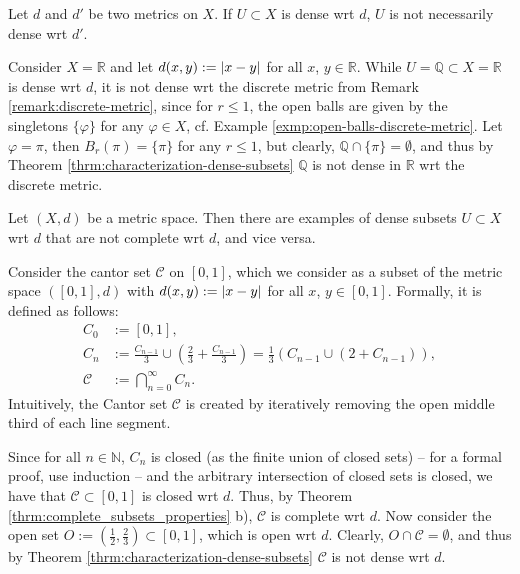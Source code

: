 \begin{remark}
	Let $d$ and $d'$ be two metrics on $X$. If $U\subset X$ is dense wrt $d$, $U$ is not necessarily dense wrt $d'$.
\end{remark}

\begin{exmp}
	Consider $X=\mathbb R$ and let $d(x, y) := \left\vert x - y \right\vert$ for all $x$, $y\in\mathbb R$. While $U = \mathbb Q \subset X = \mathbb R$ is dense wrt $d$, it is not dense wrt the discrete metric from Remark \ref{remark:discrete-metric}, since for $r \leq 1$, the open balls are given by the singletons $\{\varphi\}$ for any $\varphi\in X$, cf. Example \ref{exmp:open-balls-discrete-metric}. Let $\varphi = \pi$, then $B_{r}(\pi) = \{\pi\}$ for any $r\leq 1$, but clearly, $\mathbb Q \cap \{\pi\} = \emptyset$, and thus by Theorem \ref{thrm:characterization-dense-subsets} $\mathbb Q$ is not dense in $\mathbb R$ wrt the discrete metric.
\end{exmp}

\begin{remark}
	Let $(X, d)$ be a metric space. Then there are examples of dense subsets $U\subset X$ wrt $d$ that are not complete wrt $d$, and vice versa.
\end{remark}

\begin{exmp}
	Consider the cantor set $\mathcal C$ on $[0, 1]$, which we consider as a subset of the metric space $\left([0, 1], d\right)$ with $d(x, y) := \left\vert x - y \right\vert$ for all $x$, $y\in[0, 1]$. Formally, it is defined as follows:
	\begin{align}
		C_{0} &:= [0, 1],
		\\ C_{n} &:= \frac{C_{n-1}}{3} \cup \left(\frac{2}{3} + \frac{C_{n-1}}{3}\right) = \frac{1}{3}\left(C_{n-1} \cup \left( 2 + C_{n-1} \right)\right),
		\\ \mathcal C &:= \bigcap_{n=0}^{\infty}C_n.
	\end{align} 
	Intuitively, the Cantor set $\mathcal C$ is created by iteratively removing the open middle third of each line segment.
	
	Since for all $n\in\mathbb N$, $C_n$ is closed (as the finite union of closed sets) -- for a formal proof, use induction -- and the arbitrary intersection of closed sets is closed, we have that $\mathcal C\subset [0, 1]$ is closed wrt $d$. Thus, by Theorem \ref{thrm:complete_subsets_properties} b), $\mathcal C$ is complete wrt $d$. Now consider the open set $O := \left(\frac{1}{2}, \frac{2}{3}\right) \subset [0, 1]$, which is open wrt $d$. Clearly, $O\cap \mathcal C = \emptyset$, and thus by Theorem \ref{thrm:characterization-dense-subsets} $\mathcal C$ is not dense wrt $d$.
\end{exmp}

